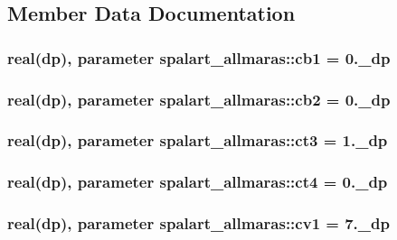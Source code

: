 \subsection{Member Data Documentation}
\hypertarget{classspalart__allmaras_a9d7b9d672e665dd9087dc129c60ece92}{
\subsubsection[{cb1}]{\setlength{\rightskip}{0pt plus 5cm}real(dp), parameter spalart\-\_\-allmaras\-::cb1 = 0.\-\_\-dp}}\label{classspalart__allmaras_a9d7b9d672e665dd9087dc129c60ece92}
\hypertarget{classspalart__allmaras_a0e36dab78c6947bce8c72722f7b571ad}{
\subsubsection[{cb2}]{\setlength{\rightskip}{0pt plus 5cm}real(dp), parameter spalart\-\_\-allmaras\-::cb2 = 0.\-\_\-dp}}\label{classspalart__allmaras_a0e36dab78c6947bce8c72722f7b571ad}
\hypertarget{classspalart__allmaras_abeaeefe8f5b898168786a0b87152baef}{
\subsubsection[{ct3}]{\setlength{\rightskip}{0pt plus 5cm}real(dp), parameter spalart\-\_\-allmaras\-::ct3 = 1.\-\_\-dp}}\label{classspalart__allmaras_abeaeefe8f5b898168786a0b87152baef}
\hypertarget{classspalart__allmaras_a614ff8dcaa3500e88090ebe3f47bf865}{
\subsubsection[{ct4}]{\setlength{\rightskip}{0pt plus 5cm}real(dp), parameter spalart\-\_\-allmaras\-::ct4 = 0.\-\_\-dp}}\label{classspalart__allmaras_a614ff8dcaa3500e88090ebe3f47bf865}
\hypertarget{classspalart__allmaras_a5576822114d4af2ba1427254bd9da98a}{
\subsubsection[{cv1}]{\setlength{\rightskip}{0pt plus 5cm}real(dp), parameter spalart\-\_\-allmaras\-::cv1 = 7.\-\_\-dp}}\label{classspalart__allmaras_a5576822114d4af2ba1427254bd9da98a}
